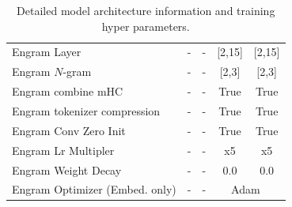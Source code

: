 \begin{table}[htbp]
{\begin{tabular}{@{}l cccc@{}}
Engram Layer & - & - & [2,15] & [2,15] \\
Engram $N$-gram & - & - & [2,3] & [2,3] \\
Engram combine mHC & - & - & True & True \\
Engram tokenizer compression  & - & - & True & True \\
Engram Conv Zero Init  & - & - & True & True \\
Engram Lr Multipler  & - & - & x5 & x5 \\
Engram Weight Decay  & - & - & 0.0 & 0.0 \\
Engram Optimizer (Embed. only)  & - & - & \multicolumn{2}{c}{Adam~\citep{kingma2014adam}}  \\
\bottomrule
\end{tabular}
}
\caption{Detailed model architecture information and training hyper parameters.}
\label{tab:detailed_arch}
\end{table}